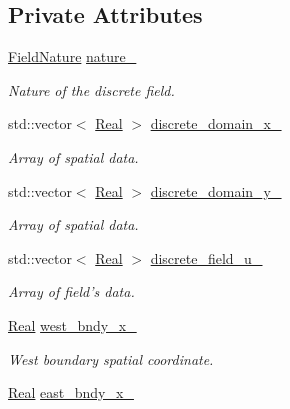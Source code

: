 \subsection*{Private Attributes}
\begin{DoxyCompactItemize}
\item 
\hyperlink{group__c02-enums_ga4c54f2a329cfb4e56213b02a259d19e2}{Field\-Nature} \hyperlink{classmtk_1_1UniStgGrid2D_ac8b66740d328803f7fbabd1c42c775b2}{nature\-\_\-}
\begin{DoxyCompactList}\small\item\em Nature of the discrete field. \end{DoxyCompactList}\item 
std\-::vector$<$ \hyperlink{group__c01-roots_gac080bbbf5cbb5502c9f00405f894857d}{Real} $>$ \hyperlink{classmtk_1_1UniStgGrid2D_ab15979865852583a46662ea592f27a4f}{discrete\-\_\-domain\-\_\-x\-\_\-}
\begin{DoxyCompactList}\small\item\em Array of spatial data. \end{DoxyCompactList}\item 
std\-::vector$<$ \hyperlink{group__c01-roots_gac080bbbf5cbb5502c9f00405f894857d}{Real} $>$ \hyperlink{classmtk_1_1UniStgGrid2D_ad69f93d4b27707d97f209b907383a7a2}{discrete\-\_\-domain\-\_\-y\-\_\-}
\begin{DoxyCompactList}\small\item\em Array of spatial data. \end{DoxyCompactList}\item 
std\-::vector$<$ \hyperlink{group__c01-roots_gac080bbbf5cbb5502c9f00405f894857d}{Real} $>$ \hyperlink{classmtk_1_1UniStgGrid2D_a4cc4df94c1049db1eb0831f8eb72b3c0}{discrete\-\_\-field\-\_\-u\-\_\-}
\begin{DoxyCompactList}\small\item\em Array of field's data. \end{DoxyCompactList}\item 
\hyperlink{group__c01-roots_gac080bbbf5cbb5502c9f00405f894857d}{Real} \hyperlink{classmtk_1_1UniStgGrid2D_ae2c61a101e6c2c9b69cef2a245512434}{west\-\_\-bndy\-\_\-x\-\_\-}
\begin{DoxyCompactList}\small\item\em West boundary spatial coordinate. \end{DoxyCompactList}\item 
\hyperlink{group__c01-roots_gac080bbbf5cbb5502c9f00405f894857d}{Real} \hyperlink{classmtk_1_1UniStgGrid2D_ab3877c2f4542b7f7486bf24a04f8a806}{east\-\_\-bndy\-\_\-x\-\_\-}

\end{DoxyCompactItemize}

